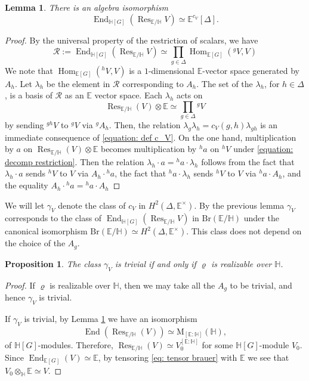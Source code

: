 \documentclass[oneside]{amsart}
\newtheorem{proposition}[theorem]{Proposition}
\newtheorem{lemma}[theorem]{Lemma}
\theoremstyle{remark}
\newcommand{\M}{\mathrm{M }}
\newcommand{\End}{\operatorname{End}}
\newcommand{\Hom}{\operatorname{Hom}}
\newcommand{\Br}{\mathrm{Br}}
\newcommand{\Res}{\operatorname{Res}}
\newcommand{\Hg}{\mathbb{H}}
\newcommand{\Eg}{\mathbb{E}}
\numberwithin{equation}{section}
\begin{document}
\begin{lemma}\label{lemma: endsofres}
There is an algebra isomorphism
$$
\End_{\Hg[G]}(\Res_{\Eg/\Hg}V)\simeq \Eg^{c_V}[\Delta].
$$
\end{lemma}

\begin{proof}
By the universal property of the restriction of scalars, we have
$$
\mathcal R:=\End_{\Hg[G]}(\Res_{\Eg/\Hg}V)\simeq \prod_{g\in \Delta} \Hom_{\Eg[G]}({}^gV, V)
$$
We note that $\Hom_{\Eg[G]}({}^hV,V)$ is a $1$-dimensional $\Eg$-vector space generated by $A_h$. Let $\lambda_h$ be the element in $\mathcal R$ corresponding to $A_h$. The set of the $\lambda_h$, for $h\in \Delta$, is a basis of $\mathcal R$ as an $\Eg$ vector space. Each $\lambda_h$ acts on
\begin{equation}\label{equation: decomp restriction}
\Res_{\Eg/\Hg}(V)\otimes \Eg\simeq \prod_{g\in \Delta} {}^gV
\end{equation}
by sending ${}^{gh}V$ to ${}^gV$ via ${}^gA_h$. 
Then, the relation $\lambda_g\lambda_h = c_V(g,h)\lambda_{gh}$ is an immediate consequence of \eqref{equation: def c_V}. On the one hand, multiplication by $a$ on $\Res_{\Eg/\Hg}(V)\otimes \Eg$ becomes multiplication by ${}^h a$ on ${}^hV$ under \eqref{equation: decomp restriction}. Then the relation $\lambda_h\cdot a={}^ha\cdot \lambda_h$ follows from the fact that $\lambda_h\cdot a$ sends ${}^{h}V$ to $V$ via $A_h\cdot {}^h a$, the fact that ${}^h a\cdot \lambda_h$ sends ${}^{h}V$ to $V$ via ${}^h a\cdot A_h$, and the equality $A_h\cdot {}^h a ={}^h a\cdot A_h$
\end{proof}

We will let $\gamma_V$ denote the class of $c_V$ in $H^2(\Delta,\Eg^\times)$. By the previous lemma $\gamma_V$ corresponds to the class of $\End_{\Hg[G]}(\Res_{\Eg/\Hg}V)$ in $\Br(\Eg/\Hg)$ under the canonical isomorphism $\Br(\Eg/\Hg)\simeq H^2(\Delta,\Eg^\times)$. This class does not depend on the choice of the $A_g$.

\begin{proposition}\label{proposition: trivcocreal}
The class $\gamma_V$ is trivial if and only if $\varrho$ is realizable over $\Hg$.
\end{proposition}

\begin{proof}
If $\varrho$ is realizable over $\Hg$, then we may take all the $A_g$ to be trivial, and hence $\gamma_V$ is trivial. 


If $\gamma_V$ is trivial, by Lemma \ref{lemma: endsofres} we have an isomorphism
\begin{equation}\label{eq: tensor brauer}\End(\Res_{\Eg/\Hg}(V))\simeq \M_{[\Eg\colon \Hg]}(\Hg),
  \end{equation}
  of $\Hg[G]$-modules. Therefore, $\Res_{\Eg/\Hg}(V)\simeq V_0^{[\Eg\colon \Hg]}$ for some $\Hg[G]$-module $V_0$. Since $\End_{\Eg[G]}(V)\simeq \Eg$, by tensoring \eqref{eq: tensor brauer} with $\Eg$ we see that $V_0\otimes_\Hg\Eg\simeq V$.
\end{proof}
\end{document}

